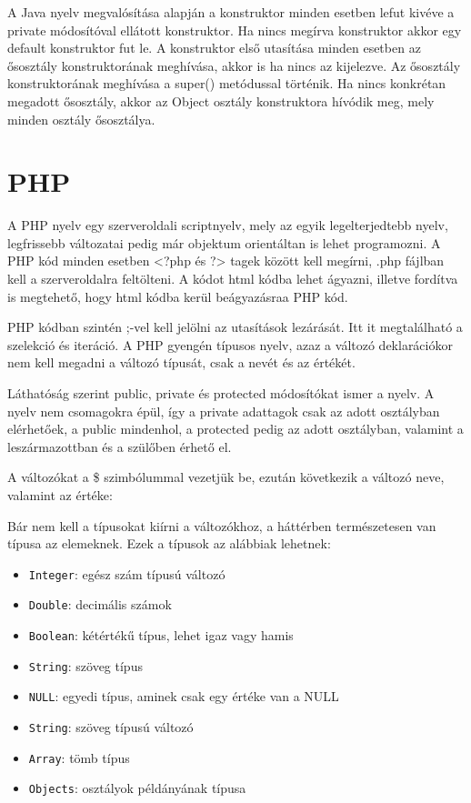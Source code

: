 A Java nyelv megvalósítása alapján a konstruktor minden esetben lefut kivéve a private módosítóval ellátott konstruktor. Ha nincs megírva konstruktor akkor egy default konstruktor fut le. A konstruktor első utasítása minden esetben az ősosztály konstruktorának meghívása, akkor is ha nincs az kijelezve. Az ősosztály konstruktorának meghívása a super() metódussal történik. Ha nincs konkrétan megadott ősosztály, akkor az Object osztály konstruktora hívódik meg, mely minden osztály ősosztálya.

\section{PHP}

A PHP nyelv egy szerveroldali scriptnyelv, mely az egyik legelterjedtebb nyelv, legfrissebb változatai pedig már objektum orientáltan is lehet programozni.
A PHP kód minden esetben <?php és ?> tagek között kell megírni, .php fájlban kell a szerveroldalra feltölteni. A kódot html kódba lehet ágyazni, illetve fordítva is megtehető, hogy html kódba kerül beágyazásraa PHP kód.

PHP kódban szintén ;-vel kell jelölni az utasítások lezárását. Itt it megtalálható a szelekció és iteráció. A PHP gyengén típusos nyelv, azaz a változó deklarációkor nem kell megadni a változó típusát, csak a nevét és az értékét.

Láthatóság szerint public, private és protected módosítókat ismer a nyelv. A nyelv nem csomagokra épül, így a private adattagok csak az adott osztályban elérhetőek, a public mindenhol, a protected pedig az adott osztályban, valamint a leszármazottban és a szülőben érhető el.

A változókat a \$ szimbólummal vezetjük be, ezután következik a változó neve, valamint az értéke:

Bár nem kell a típusokat kiírni a változókhoz, a háttérben természetesen van típusa az elemeknek. Ezek a típusok az alábbiak lehetnek:
\begin{itemize}
\item \texttt{Integer}: egész szám típusú változó
\item \texttt{Double}: decimális számok
\item \texttt{Boolean}: kétértékű típus, lehet igaz vagy hamis
\item \texttt{String}: szöveg típus
\item \texttt{NULL}: egyedi típus, aminek csak egy értéke van a NULL
\item \texttt{String}: szöveg típusú változó
\item \texttt{Array}: tömb típus
\item \texttt{Objects}: osztályok példányának típusa
\end{itemize}

